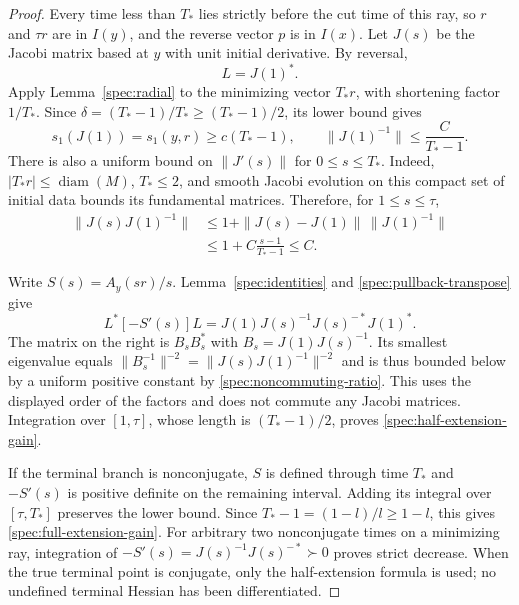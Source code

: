 \begin{proof}
Every time less than $T_*$ lies strictly before the cut time of this
ray, so $r$ and $\tau r$ are in $I(y)$, and the reverse vector $p$
is in $I(x)$.  Let $J(s)$ be the Jacobi matrix based at $y$ with
unit initial derivative.  By reversal,
\begin{equation}\label{spec:pullback-transpose}
  L=J(1)^*.
\end{equation}
Apply Lemma~\ref{spec:radial} to the minimizing vector $T_*r$,
with shortening factor $1/T_*$.  Since
$\delta=(T_*-1)/T_*\ge(T_*-1)/2$, its lower bound gives
\begin{equation}\label{spec:J-one-inverse}
  s_1(J(1))=s_1(y,r)\ge c(T_*-1),
  \qquad \|J(1)^{-1}\|\le\frac{C}{T_*-1}.
\end{equation}
There is also a uniform bound on $\|J'(s)\|$ for $0\le s\le T_*$.
Indeed, $|T_*r|\le\operatorname{diam}(M)$, $T_*\le2$, and smooth
Jacobi evolution on this compact set of initial data bounds its
fundamental matrices.  Therefore, for $1\le s\le\tau$,
\begin{equation}\label{spec:noncommuting-ratio}
\begin{split}
  \|J(s)J(1)^{-1}\|
   &\le 1+\|J(s)-J(1)\|\,\|J(1)^{-1}\|\\
   &\le 1+C\frac{s-1}{T_*-1}\le C.
\end{split}
\end{equation}

Write $S(s)=A_y(sr)/s$.  Lemma~\ref{spec:identities} and
\eqref{spec:pullback-transpose} give
\begin{equation}\label{spec:noncommuting-positive}
  L^*[-S'(s)]L
    =J(1)J(s)^{-1}J(s)^{-*}J(1)^*.
\end{equation}
The matrix on the right is $B_sB_s^*$ with
$B_s=J(1)J(s)^{-1}$.  Its smallest eigenvalue equals
$\|B_s^{-1}\|^{-2}=\|J(s)J(1)^{-1}\|^{-2}$ and is thus bounded
below by a uniform positive constant by
\eqref{spec:noncommuting-ratio}.  This uses the displayed order of
the factors and does not commute any Jacobi matrices.  Integration
over $[1,\tau]$, whose length is $(T_*-1)/2$, proves
\eqref{spec:half-extension-gain}.

If the terminal branch is nonconjugate, $S$ is defined through time
$T_*$ and $-S'(s)$ is positive definite on the remaining interval.
Adding its integral over $[\tau,T_*]$ preserves the lower bound.
Since $T_*-1=(1-l)/l\ge1-l$, this gives
\eqref{spec:full-extension-gain}.  For arbitrary two nonconjugate
times on a minimizing ray, integration of
$-S'(s)=J(s)^{-1}J(s)^{-*}\succ0$ proves strict decrease.  When the
true terminal point is conjugate, only the half-extension formula
is used; no undefined terminal Hessian has been differentiated.
\end{proof}

